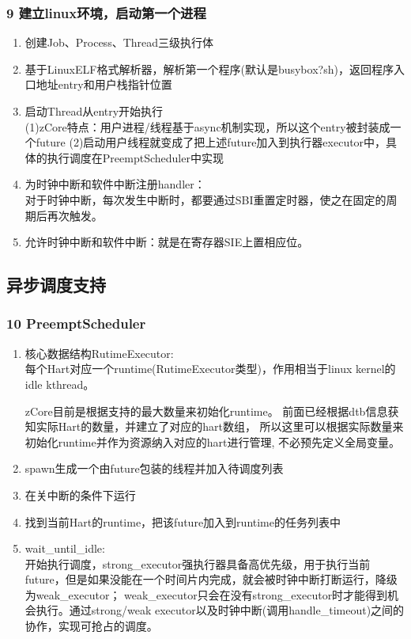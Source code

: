 \documentclass[
8pt, %
]{beamer}
\begin{document}
	\begin{frame}
		\frametitle{9 建立linux环境，启动第一个进程}
		\begin{enumerate}
			\item 创建Job、Process、Thread三级执行体
			\item 基于LinuxELF格式解析器，解析第一个程序(默认是busybox?sh)，返回程序入口地址entry和用户栈指针位置
			\item 启动Thread从entry开始执行\\
			(1)zCore特点：用户进程/线程基于async机制实现，所以这个entry被封装成一个future
			(2)启动用户线程就变成了把上述future加入到执行器executor中，具体的执行调度在PreemptScheduler中实现
			\item 为时钟中断和软件中断注册handler：\\
			对于时钟中断，每次发生中断时，都要通过SBI重置定时器，使之在固定的周期后再次触发。
			\item 允许时钟中断和软件中断：就是在寄存器SIE上置相应位。
		\end{enumerate}
	\end{frame}

	\subsection{异步调度支持}

	\begin{frame}
		\frametitle{10 PreemptScheduler}
		\begin{enumerate}
			\item 核心数据结构RutimeExecutor:\\
			每个Hart对应一个runtime(RutimeExecutor类型)，作用相当于linux kernel的idle kthread。
			\begin{block}{}
			zCore目前是根据支持的最大数量来初始化runtime。
			前面已经根据dtb信息获知实际Hart的数量，并建立了对应的hart数组，
			所以这里可以根据实际数量来初始化runtime并作为资源纳入对应的hart进行管理, 不必预先定义全局变量。
			\end{block}
			\item spawn生成一个由future包装的线程并加入待调度列表
			\item 在关中断的条件下运行
			\item 找到当前Hart的runtime，把该future加入到runtime的任务列表中
			\item wait\_until\_idle:\\
			开始执行调度，strong\_executor强执行器具备高优先级，用于执行当前future，但是如果没能在一个时间片内完成，就会被时钟中断打断运行，降级为weak\_executor；
			weak\_executor只会在没有strong\_executor时才能得到机会执行。通过strong/weak executor以及时钟中断(调用handle\_timeout)之间的协作，实现可抢占的调度。
		\end{enumerate}
	\end{frame}
\end{document}
